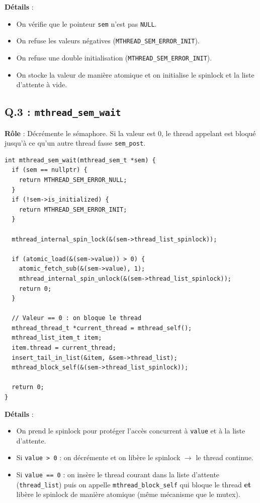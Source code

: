 \documentclass[12pt,a4paper]{article}
\begin{document}
\textbf{Détails} :
\begin{itemize}
  \item On vérifie que le pointeur \texttt{sem} n'est pas \texttt{NULL}.
  \item On refuse les valeurs négatives (\texttt{MTHREAD\_SEM\_ERROR\_INIT}).
  \item On refuse une double initialisation (\texttt{MTHREAD\_SEM\_ERROR\_INIT}).
  \item On stocke la valeur de manière atomique et on initialise le spinlock et la liste d'attente à vide.
\end{itemize}

\subsection*{Q.3 : \texttt{mthread\_sem\_wait}}

\textbf{Rôle} : Décrémente le sémaphore. Si la valeur est 0, le thread appelant est bloqué jusqu'à ce qu'un autre thread fasse \texttt{sem\_post}.

\begin{lstlisting}
int mthread_sem_wait(mthread_sem_t *sem) {
  if (sem == nullptr) {
    return MTHREAD_SEM_ERROR_NULL;
  }
  if (!sem->is_initialized) {
    return MTHREAD_SEM_ERROR_INIT;
  }

  mthread_internal_spin_lock(&(sem->thread_list_spinlock));

  if (atomic_load(&(sem->value)) > 0) {
    atomic_fetch_sub(&(sem->value), 1);
    mthread_internal_spin_unlock(&(sem->thread_list_spinlock));
    return 0;
  }

  // Valeur == 0 : on bloque le thread
  mthread_thread_t *current_thread = mthread_self();
  mthread_list_item_t item;
  item.thread = current_thread;
  insert_tail_in_list(&item, &sem->thread_list);
  mthread_block_self(&(sem->thread_list_spinlock));

  return 0;
}
\end{lstlisting}

\textbf{Détails} :
\begin{itemize}
  \item On prend le spinlock pour protéger l'accès concurrent à \texttt{value} et à la liste d'attente.
  \item Si \texttt{value > 0} : on décrémente et on libère le spinlock $\rightarrow$ le thread continue.
  \item Si \texttt{value == 0} : on insère le thread courant dans la liste d'attente (\texttt{thread\_list}) puis on appelle \texttt{mthread\_block\_self} qui bloque le thread \textbf{et} libère le spinlock de manière atomique (même mécanisme que le mutex).
\end{itemize}
\end{document}
